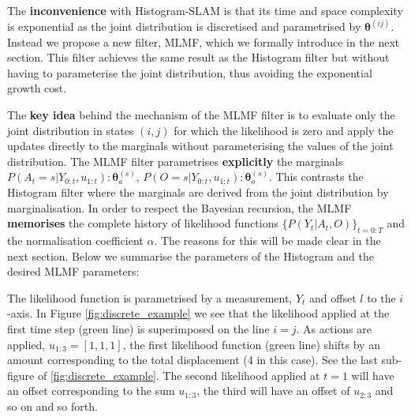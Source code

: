 The \textbf{inconvenience} with Histogram-SLAM is that its time and space complexity is exponential as the joint distribution is discretised and 
parametrised by $\boldsymbol{\theta}^{(ij)}$. Instead we propose a new filter, MLMF, which we formally introduce in the next section. This filter
achieves the same result as the Histogram filter but without having to parameterise the joint distribution, thus avoiding the exponential growth cost. 

The \textbf{key idea} behind the mechanism of the MLMF filter is to evaluate only the joint distribution in states $(i,j)$ 
for which the likelihood is zero and apply the updates directly to the marginals without parameterising the values of the joint distribution.
The MLMF filter parametrises \textbf{explicitly} the marginals $P(A_t=s|Y_{0:t},u_{1:t}): \boldsymbol{\theta}_a^{(s)}$, $P(O=s|Y_{0:t},u_{1:t}): \boldsymbol{\theta}_o^{(s)}$. 
This contrasts the Histogram filter where the marginals are  
derived from the joint distribution by marginalisation. In order to respect the Bayesian recursion, the MLMF \textbf{memorises} the complete history of likelihood functions $\{P(Y_t|A_t,O)\}_{t=0:T}$ and the normalisation coefficient $\alpha$. 
The reasons for this will be made clear in the next section. Below we summarise the parameters of the Histogram and the 
desired MLMF parameters:

\begin{center}
\begin{minipage}{0.55\textwidth}
\end{minipage}
\end{center}

The likelihood function is parametrised by a measurement, $Y_t$ and offset $l$ to the $i$-axis. In Figure \ref{fig:discrete_example} we see that
the likelihood applied at the first time step (green line) is superimposed on the line $i=j$. As actions are applied, $u_{1:3}=[1,1,1]$, 
the first likelihood function (green line) shifts by an amount corresponding to the total displacement (4 in this case). See the last sub-figure of
\ref{fig:discrete_example}. The second likelihood applied at $t=1$ will have an offset corresponding to the sum $u_{1:3}$, the third will have 
an offset of $u_{2:3}$ and so on and so forth.

